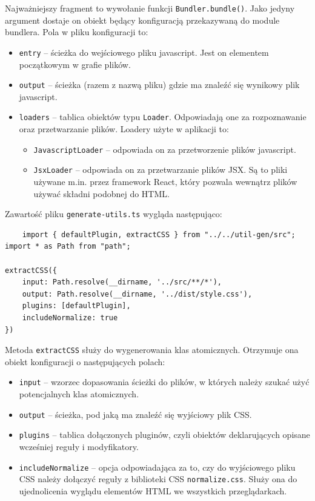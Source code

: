 \documentclass{SGGW-thesis}
\begin{document}
Najważniejszy fragment to wywołanie funkcji \verb|Bundler.bundle()|. Jako jedyny argument dostaje on obiekt będący konfiguracją przekazywaną do module bundlera. Pola w pliku konfiguracji to:
\begin{itemize}
    \item \verb|entry| -- ścieżka do wejściowego pliku javascript. Jest on elementem początkowym w grafie plików.
    \item \verb|output| -- ścieżka (razem z nazwą pliku) gdzie ma znaleźć się wynikowy plik javascript.
    \item \verb|loaders| -- tablica obiektów typu \verb|Loader|. Odpowiadają one za rozpoznawanie oraz przetwarzanie plików. Loadery użyte w aplikacji to:
    \begin{itemize}
        \item \verb|JavascriptLoader| -- odpowiada on za przetworzenie plików javascript.
        \item \verb|JsxLoader| -- odpowiada on za przetwarzanie plików JSX. Są to pliki używane m.in. przez framework React, który pozwala wewnątrz plików używać składni podobnej do HTML.
    \end{itemize}
\end{itemize}

Zawartość pliku \verb|generate-utils.ts| wygląda następująco:
\begin{verbatim}
    import { defaultPlugin, extractCSS } from "../../util-gen/src";
import * as Path from "path";

extractCSS({
	input: Path.resolve(__dirname, '../src/**/*'),
	output: Path.resolve(__dirname, '../dist/style.css'),
	plugins: [defaultPlugin],
	includeNormalize: true
})
\end{verbatim}

Metoda \verb|extractCSS| służy do wygenerowania klas atomicznych. Otrzymuje ona obiekt konfiguracji o następujących polach:
\begin{itemize}
    \item \verb|input| -- wzorzec dopasowania ścieżki do plików, w których należy szukać użyć potencjalnych klas atomicznych.
    \item \verb|output| -- ścieżka, pod jaką ma znaleźć się wyjściowy plik CSS.
    \item \verb|plugins| -- tablica dołączonych pluginów, czyli obiektów deklarujących opisane wcześniej reguły i modyfikatory.
    \item \verb|includeNormalize| -- opcja odpowiadająca za to, czy do wyjściowego pliku CSS należy dołączyć reguły z biblioteki CSS \verb|normalize.css|. Służy ona do ujednolicenia wyglądu elementów HTML we wszystkich przeglądarkach.
\end{itemize}
\end{document}
